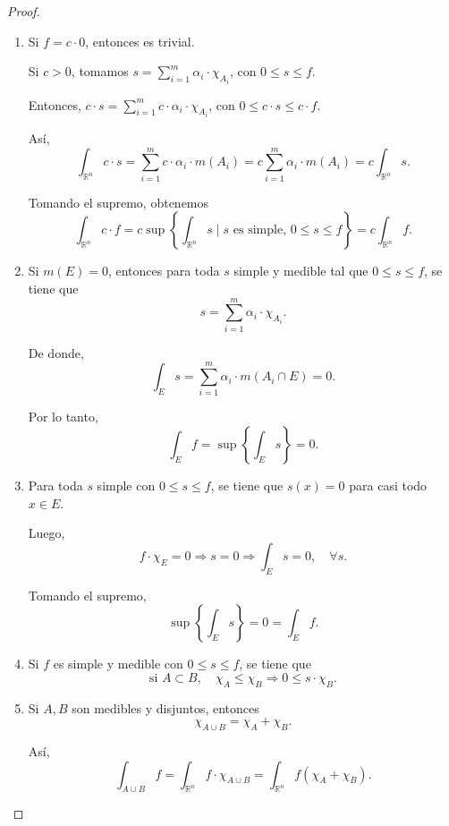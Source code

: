\begin{proof}
    \begin{enumerate}
        \item Si $f = c \cdot 0$, entonces es trivial.

              Si $c > 0$, tomamos $s = \sum_{i=1}^{m} \alpha_i \cdot \chi_{A_i}$, con $0 \leq
                  s \leq f$.

              Entonces, $c \cdot s = \sum_{i=1}^{m} c \cdot \alpha_i \cdot \chi_{A_i}$, con
              $0 \leq c \cdot s \leq c \cdot f$.

              Así, $$ \int_{\mathbb{R}^n} c \cdot s = \sum_{i=1}^{m} c \cdot \alpha_i \cdot
                  m(A_i) = c \sum_{i=1}^{m} \alpha_i \cdot m(A_i) = c \int_{\mathbb{R}^n} s. $$

              Tomando el supremo, obtenemos $$ \int_{\mathbb{R}^n} c \cdot f = c \sup \left\{
                  \int_{\mathbb{R}^n} s \mid s \text{ es simple, } 0 \leq s \leq f \right\} = c
                  \int_{\mathbb{R}^n} f. $$

        \item Si $m(E) = 0$, entonces para toda $s$ simple y medible tal que $0 \leq s \leq
                  f$, se tiene que $$ s = \sum_{i=1}^{m} \alpha_i \cdot \chi_{A_i}. $$

              De donde, $$ \int_{E} s = \sum_{i=1}^{m} \alpha_i \cdot m(A_i \cap E) = 0. $$

              Por lo tanto, $$ \int_E f = \sup \left\{ \int_E s \right\} = 0. $$

        \item Para toda $s$ simple con $0 \leq s \leq f$, se tiene que $s(x) = 0$ para casi
              todo $x \in E$.

              Luego, $$ f \cdot \chi_E = 0 \Rightarrow s = 0 \Rightarrow \int_E s = 0, \quad
                  \forall s. $$

              Tomando el supremo, $$ \sup \left\{ \int_E s \right\} = 0 = \int_E f. $$

        \item Si $f$ es simple y medible con $0 \leq s \leq f$, se tiene que $$ \text{si } A
                  \subset B, \quad \chi_A \leq \chi_B \Rightarrow 0 \leq s \cdot \chi_B. $$

        \item  Si $A, B$ son medibles y disjuntos, entonces $$ \chi_{A \cup B} = \chi_A +
                  \chi_B. $$

              Así, $$ \int_{A \cup B} f = \int_{\mathbb{R}^n} f \cdot \chi_{A \cup B} =
                  \int_{\mathbb{R}^n} f (\chi_A + \chi_B). $$


\end{enumerate}
\end{proof}
